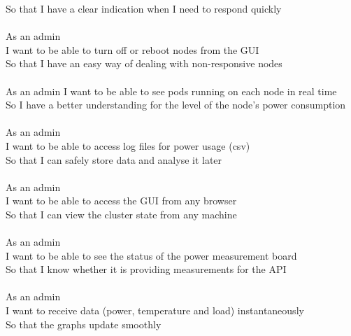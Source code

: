 \documentclass{l4proj}
\begin{document}
\begin{appendices}
So that I have a clear indication when I need to respond quickly\\\\
\noindent
As an admin\\
I want to be able to turn off or reboot nodes from the GUI\\
So that I have an easy way of dealing with non-responsive nodes\\\\
\noindent
As an admin
I want to be able to see pods running on each node in real time\\
So I have a better understanding for the level of the node's power consumption\\\\
\noindent
As an admin\\
I want to be able to access log files for power usage (csv)\\
So that I can safely store data and analyse it later\\\\
\noindent
As an admin\\
I want to be able to access the GUI from any browser\\
So that I can view the cluster state from any machine\\\\
\noindent
As an admin \\
I want to be able to see the status of the power measurement board\\
So that I know whether it is providing measurements for the API\\\\
\noindent
As an admin\\
I want to receive data (power, temperature and load) instantaneously\\
So that the graphs update smoothly\\\\

\end{appendices}



\end{document}
